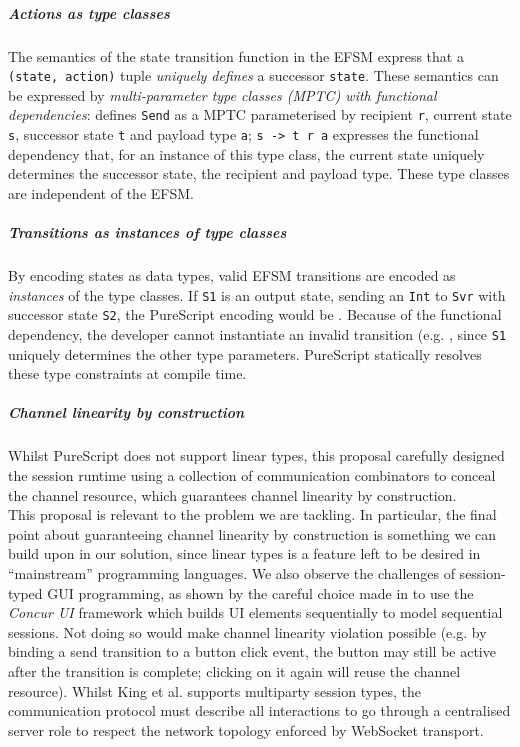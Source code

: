 \subparagraph{Actions as type classes} 
The semantics of the state transition function 
in the EFSM express that a \texttt{(state, action)} tuple
\textit{uniquely defines} a successor \texttt{state}. 
These semantics can be expressed by 
\textit{multi-parameter type classes (MPTC) 
with functional dependencies}: 
defines \texttt{Send} as a MPTC 
parameterised by recipient \texttt{r}, 
current state \texttt{s}, successor state \texttt{t} 
and payload type \texttt{a}; 
\texttt{s -> t r a} expresses the functional dependency that, 
for an instance of this type class, 
the current state uniquely determines the
successor state, the recipient and payload type. 
These type classes are independent of the EFSM.

\subparagraph{Transitions as instances of type classes} 
By encoding states as data types, 
valid EFSM transitions are encoded as 
\textit{instances} of the type classes. 
If \texttt{S1} is an output state, 
sending an \texttt{Int} to \texttt{Svr} with 
successor state \texttt{S2}, the PureScript encoding would be
.
Because of the functional dependency, 
the developer cannot instantiate an invalid transition 
(e.g. , 
since \texttt{S1} uniquely determines the other type parameters. 
PureScript statically resolves these type constraints at
compile time.

\subparagraph{Channel linearity by construction}
Whilst PureScript does not support linear types,
this proposal carefully designed the session runtime using 
a collection of communication combinators to conceal the
channel resource, which guarantees channel linearity by construction.\\

This proposal is relevant to the problem we are tackling.
In particular, the final point about guaranteeing channel linearity
by construction is something we can build upon in our solution,
since linear types is a feature left to be desired in
``mainstream'' programming languages.
We also observe the challenges of session-typed GUI
programming, as shown by the careful choice 
made in \cite{PureScript2019} 
to use the \textit{Concur UI} framework \cite{ConcurUI} which 
builds UI elements sequentially to model sequential sessions.
Not doing so would make channel linearity violation possible 
(e.g. by binding a send transition to a button click event,
the button may still be active after the transition is complete;
clicking on it again will reuse the channel resource).
Whilst King et al. \cite{PureScript2019} supports 
multiparty session types,
the communication protocol must describe all interactions
to go through a centralised server role to respect the
network topology enforced by WebSocket transport.

